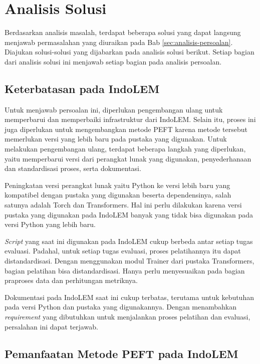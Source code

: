 \section{Analisis Solusi}

Berdasarkan analisis masalah, terdapat beberapa solusi yang dapat langsung menjawab permasalahan yang diuraikan pada Bab \ref{sec:analisis-persoalan}. Diajukan solusi-solusi yang dijabarkan pada analisis solusi berikut. Setiap bagian dari analisis solusi ini  menjawab setiap bagian pada analisis persoalan.

\subsection{Keterbatasan pada IndoLEM}

Untuk menjawab persoalan ini, diperlukan pengembangan ulang untuk memperbarui dan memperbaiki infrastruktur dari IndoLEM. Selain itu, proses ini juga diperlukan untuk mengembangkan metode PEFT karena metode tersebut memerlukan versi yang lebih baru pada pustaka yang digunakan. Untuk melakukan pengembangan ulang, terdapat beberapa langkah yang diperlukan, yaitu memperbarui versi dari perangkat lunak yang digunakan, penyederhanaan dan standardisasi proses, serta dokumentasi.

Peningkatan versi perangkat lunak yaitu Python ke versi lebih baru yang kompatibel dengan pustaka yang  digunakan beserta dependensinya, salah satunya adalah Torch dan Transformers. Hal ini perlu dilakukan karena versi pustaka yang digunakan pada IndoLEM banyak yang tidak bisa digunakan pada versi Python yang lebih baru.

\textit{Script} yang saat ini digunakan pada IndoLEM cukup berbeda antar setiap tugas evaluasi. Padahal, untuk setiap tugas evaluasi, proses pelatihannya itu dapat distandardisasi. Dengan menggunakan modul Trainer dari pustaka Transformers, bagian pelatihan bisa distandardisasi. Hanya perlu menyesuaikan pada bagian praproses data dan perhitungan metriknya.

Dokumentasi pada IndoLEM saat ini cukup terbatas, terutama untuk kebutuhan pada versi Python dan pustaka yang digunakannya. Dengan menambahkan \textit{requirement} yang dibutuhkan untuk menjalankan proses pelatihan dan evaluasi, persalahan ini dapat terjawab.

\subsection{Pemanfaatan Metode PEFT pada IndoLEM}

